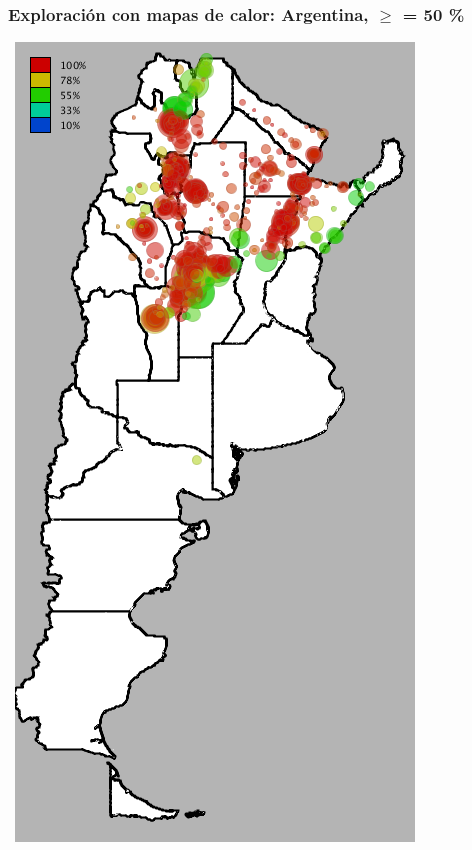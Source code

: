 \documentclass[xcolor=x11names]{beamer}
\begin{document}
\begin{frame}
	\frametitle{Exploración con mapas de calor: Argentina, $\geq$ = 50 \%}
	\center\
	\includegraphics[height=.9\textheight,width = .9\columnwidth, keepaspectratio]
	{slides/201112_hi_res_argentina_usuarios_proporcion_circulos_beta50.png}
\end{frame}
\end{document}
